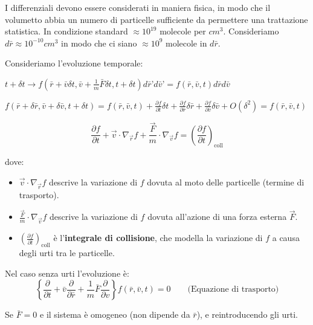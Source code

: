 I differenziali devono essere considerati in maniera fisica, in modo che il volumetto abbia un numero di particelle sufficiente da permettere una trattazione statistica. In condizione standard $\approx 10^{19}$ molecole per $cm^3$. Consideriamo $d \bar{r} \approx 10^{-10} cm^3$ in modo che ci siano $\approx 10^{9}$ molecole in $d \bar{r}$.

Consideriamo l’evoluzione temporale:

$t + \delta t \longrightarrow f(\bar{r}+ \bar{v} \delta t, \bar{v} + \frac{1}{m} \bar{F} \delta t, t+ \delta t ) d\bar{r}’ d\bar{v}’ = f(\bar{r}, \bar{v} , t) d\bar{r} d\bar{v}$

$f (\bar{r}+ \delta \bar{r}, \bar{v} + \delta \bar{v}, t+\delta t) = f (\bar{r}, \bar{v}, t) +  \frac{\partial f}{\partial t} \delta t +  \frac{\partial f}{\partial \bar{r}} \delta \bar{r} + \frac{\partial f}{\partial \bar{v}} \delta \bar{v} + O(\delta^2) =    f (\bar{r}, \bar{v}, t)$

\begin{equation}
    \frac{\partial f}{\partial t} + \vec{v} \cdot \nabla_{\vec{r}} f + \frac{\vec{F}}{m} \cdot \nabla_{\vec{v}} f = \left( \frac{\partial f}{\partial t} \right)_{\text{coll}}
    \label{eq:boltzmann_equation}
\end{equation}

dove:
\begin{itemize}
    \item $\vec{v} \cdot \nabla_{\vec{r}} f$ descrive la variazione di $f$ dovuta al moto delle particelle (termine di trasporto).
    \item $\frac{\vec{F}}{m} \cdot \nabla_{\vec{v}} f$ descrive la variazione di $f$ dovuta all'azione di una forza esterna $\vec{F}$.
    \item $\left( \frac{\partial f}{\partial t} \right)_{\text{coll}}$ è l'\textbf{integrale di collisione}, che modella la variazione di $f$ a causa degli urti tra le particelle.
\end{itemize}

Nel caso senza urti l’evoluzione è:
\begin{equation}
    \left \{ \frac{\partial}{\partial t} + \bar{v} \frac{\partial}{\partial \bar{r}} + \frac{1}{m}\bar{F} \frac{\partial}{\partial v}  \right\} f (\bar{r}, \bar{v}, t) =0 \quad \quad \text{(Equazione di trasporto)}
    \label{eq:transport_equation}
\end{equation}

Se $\bar{F} =0$ e il sistema è omogeneo (non dipende da $\bar{r}$), e reintroducendo gli urti.

